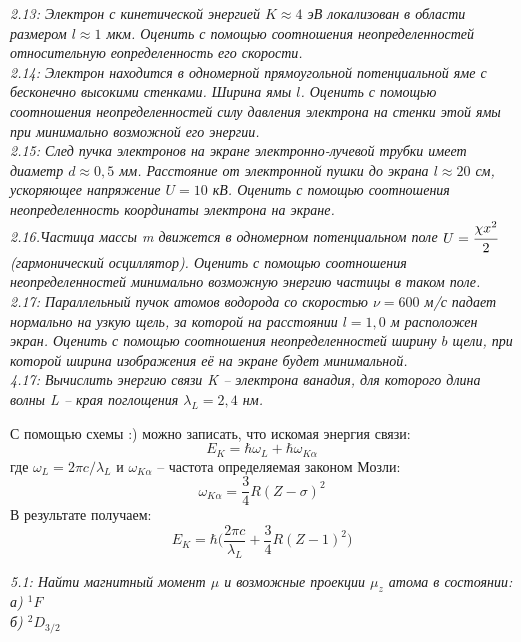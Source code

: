     \emph{2.13: Электрон с кинетической энергией \( K \approx 4 \) эВ 
       	локализован в области размером \( l \approx 1 \) мкм. 
        Оценить с помощью соотношения неопределенностей 
        относительную еопределенность его скорости.}\\

    \emph{2.14: Электрон находится в одномерной прямоугольной 
      	потенциальной яме с бесконечно высокими стенками. 
       	Ширина ямы \( l \). Оценить с помощью соотношения 
       	неопределенностей силу давления электрона на стенки этой
		ямы при минимально возможной его энергии.}\\

	\emph{2.15: След пучка электронов на экране электронно-лучевой 
		трубки имеет диаметр \( d \approx 0,5 \) мм. Расстояние от 
		электронной пушки до экрана \( l \approx 20 \) см, 
		ускоряющее напряжение \( U = 10 \) кВ. Оценить с помощью 
		соотношения неопределенность координаты электрона на экране.}\\

	\emph{2.16.Частица массы m движется в одномерном потенциальном 
		поле \( U = \cfrac{\chi x^2}{2} \) (гармонический осциллятор). 
		Оценить с помощью соотношения неопределенностей минимально 
		возможную энергию частицы в таком поле.}\\

	\emph{2.17: Параллельный пучок атомов водорода со скоростью 
		\( \nu = 600 \) м/с падает нормально на узкую щель, за которой 
		на расстоянии \( l = 1,0 \) м расположен экран. Оценить с помощью 
		соотношения неопределенностей ширину \( b \) щели, при которой 
		ширина изображения её на экране будет минимальной.}\\

    \emph{4.17: Вычислить энергию связи K -- электрона ванадия, для
        которого длина волны L -- края поглощения 
        \( \lambda_L = 2,4 \) нм.}

        С помощью схемы :) можно записать, что искомая энергия связи: 
        \[ E_K = \hbar\omega_L + \hbar\omega_{K\alpha} \]
        где \( \omega_L = 2\pi c/\lambda_L \) и 
        \( \omega_{K\alpha} \) -- частота определяемая законом Мозли:
        \[ \omega_{K\alpha} = \frac{3}{4}R(Z-\sigma)^2 \]
        В результате получаем:
        \[ 
            E_K = \hbar
            \Big( 
                \frac{2\pi c}{\lambda_L} + \frac{3}{4}R(Z-1)^2
            \Big)
        \]

	\emph{5.1: Найти магнитный момент \( \mu \) и возможные проекции 
        \( \mu_z \) атома в состоянии:\\
        а) \(^1F \) \\
        б) \(^2D_{3/2} \)} 
    
